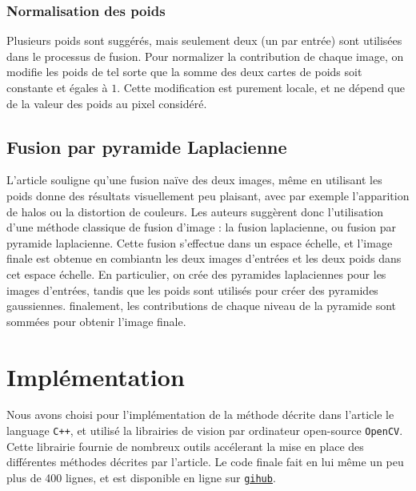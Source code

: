 \documentclass[twoside]{article}
\begin{document}
\begin{multicols}{2}
 \subsubsection{Normalisation des poids}
Plusieurs poids sont suggérés, mais seulement deux (un par entrée) sont utilisées dans le processus de fusion. Pour normalizer la contribution de chaque image, on modifie les poids de tel sorte que la somme des deux cartes de poids soit constante et égales à $1$. Cette modification est purement locale, et ne dépend que de la valeur des poids au pixel considéré.

\subsection{Fusion par pyramide Laplacienne}
L'article souligne qu'une fusion naïve des deux images, même en utilisant les poids donne des résultats visuellement peu plaisant, avec par exemple l'apparition de halos ou la distortion de couleurs. Les auteurs suggèrent donc l'utilisation d'une méthode classique de fusion d'image : la fusion laplacienne, ou fusion par pyramide laplacienne. Cette fusion s'effectue dans un espace échelle, et l'image finale est obtenue en combiantn les deux images d'entrées et les deux poids dans cet espace échelle. En particulier, on crée des pyramides laplaciennes pour les images d'entrées, tandis que les poids sont utilisés pour créer des pyramides gaussiennes. finalement, les contributions de chaque niveau de la pyramide sont sommées pour obtenir l'image finale.

\section{Implémentation}
Nous avons choisi pour l'implémentation de la méthode décrite dans l'article le language \texttt{C++}, et utilisé la librairies de vision par ordinateur open-source \texttt{OpenCV}. Cette librairie fournie de nombreux outils accélerant la mise en place des différentes méthodes décrites par l'article. Le code finale fait en lui même un peu plus de 400 lignes, et est disponible en ligne sur \texttt{\href{http://github.com/jcaille/Submarine}{gihub}}.


\end{multicols}
\end{document}

